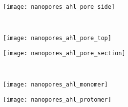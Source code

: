 %
\begin{figure*}[p]
  \centering
  \medskip
  
  \begin{minipage}[t]{53mm}
    \begin{subfigure}[b]{53mm}
      \centering
      \caption{}\vspace{-8.5mm}\hspace{1.5mm}\label{fig:nanopores_ahl_pore_side}
      \texttt{[image: nanopores\_ahl\_pore\_side]}
    \end{subfigure}
    \vspace{5mm} \\
    \begin{subfigure}[b]{53mm}
      \centering
      \caption{}\vspace{-8.5mm}\hspace{1.5mm}\label{fig:nanopores_ahl_pore_top}
      \texttt{[image: nanopores\_ahl\_pore\_top]}
    \end{subfigure}
  \end{minipage}
  \begin{minipage}{65mm}
    \begin{subfigure}[t]{53mm}
      \centering
      \caption{}\vspace{-8.5mm}\hspace{1.5mm}\label{fig:nanopores_ahl_pore_section}
      \texttt{[image: nanopores\_ahl\_pore\_section]}
    \end{subfigure}
    \vspace{5mm} \\
    \begin{subfigure}[b]{32mm}
      \caption{}\vspace{-8.5mm}\hspace{1.5mm}\label{fig:nanopores_ahl_monomer}
      \texttt{[image: nanopores\_ahl\_monomer]}
    \end{subfigure}
    \begin{subfigure}[b]{32mm}
      \centering
      \caption{}\vspace{-8.5mm}\hspace{1.5mm}\label{fig:nanopores_ahl_protomer}
      \texttt{[image: nanopores\_ahl\_protomer]}
    \end{subfigure}
  \end{minipage}
%


\end{figure*}
